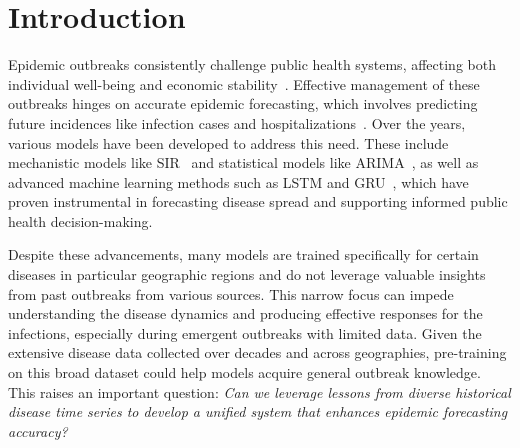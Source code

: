 \section{Introduction}
Epidemic outbreaks consistently challenge public health systems, affecting both individual well-being and economic stability~\cite{nicola2020socio}. Effective management of these outbreaks hinges on accurate epidemic forecasting, which involves predicting future incidences like infection cases and hospitalizations~\cite{liu2024review, wan2024epidemiology, adhikari2019epideep}. Over the years, various models have been developed to address this need. These include mechanistic models like SIR~\cite{cooper2020sir} and statistical models like ARIMA~\cite{sahai2020arima, kontopoulou2023review}, as well as advanced machine learning methods such as LSTM and GRU~\cite{shahid2020predictions}, which have proven instrumental in forecasting disease spread and supporting informed public health decision-making.



Despite these advancements, many models are trained specifically for certain diseases in particular geographic regions and do not leverage valuable insights from past outbreaks from various sources. This narrow focus can impede understanding the disease dynamics and producing effective responses for the infections, especially during emergent outbreaks with limited data. Given the extensive disease data collected over decades and across geographies, pre-training on this broad dataset could help models acquire general outbreak knowledge. This raises an important question:
\textit{Can we leverage lessons from diverse historical disease time series to develop a unified system that enhances epidemic forecasting accuracy?}



